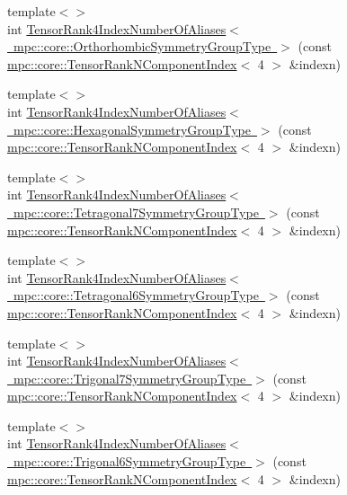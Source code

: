 \begin{DoxyCompactItemize}
\item 
{\footnotesize template$<$$>$ }\\int \mbox{\hyperlink{namespacempc_1_1core_a437f4bdfb137d17ac070b9ff54f889bf}{Tensor\+Rank4\+Index\+Number\+Of\+Aliases$<$ mpc\+::core\+::\+Orthorhombic\+Symmetry\+Group\+Type $>$}} (const \mbox{\hyperlink{classmpc_1_1core_1_1_tensor_rank_n_component_index}{mpc\+::core\+::\+Tensor\+Rank\+N\+Component\+Index}}$<$ 4 $>$ \&indexn)
\item 
{\footnotesize template$<$$>$ }\\int \mbox{\hyperlink{namespacempc_1_1core_acced519e371dd13b347144a098e4b34f}{Tensor\+Rank4\+Index\+Number\+Of\+Aliases$<$ mpc\+::core\+::\+Hexagonal\+Symmetry\+Group\+Type $>$}} (const \mbox{\hyperlink{classmpc_1_1core_1_1_tensor_rank_n_component_index}{mpc\+::core\+::\+Tensor\+Rank\+N\+Component\+Index}}$<$ 4 $>$ \&indexn)
\item 
{\footnotesize template$<$$>$ }\\int \mbox{\hyperlink{namespacempc_1_1core_afe7eb270332a274e4ee837d6d0f740bf}{Tensor\+Rank4\+Index\+Number\+Of\+Aliases$<$ mpc\+::core\+::\+Tetragonal7\+Symmetry\+Group\+Type $>$}} (const \mbox{\hyperlink{classmpc_1_1core_1_1_tensor_rank_n_component_index}{mpc\+::core\+::\+Tensor\+Rank\+N\+Component\+Index}}$<$ 4 $>$ \&indexn)
\item 
{\footnotesize template$<$$>$ }\\int \mbox{\hyperlink{namespacempc_1_1core_ac976c8820421fa076d712f77e36a871e}{Tensor\+Rank4\+Index\+Number\+Of\+Aliases$<$ mpc\+::core\+::\+Tetragonal6\+Symmetry\+Group\+Type $>$}} (const \mbox{\hyperlink{classmpc_1_1core_1_1_tensor_rank_n_component_index}{mpc\+::core\+::\+Tensor\+Rank\+N\+Component\+Index}}$<$ 4 $>$ \&indexn)
\item 
{\footnotesize template$<$$>$ }\\int \mbox{\hyperlink{namespacempc_1_1core_ab16fd1951e2b9044702fa7844807dd84}{Tensor\+Rank4\+Index\+Number\+Of\+Aliases$<$ mpc\+::core\+::\+Trigonal7\+Symmetry\+Group\+Type $>$}} (const \mbox{\hyperlink{classmpc_1_1core_1_1_tensor_rank_n_component_index}{mpc\+::core\+::\+Tensor\+Rank\+N\+Component\+Index}}$<$ 4 $>$ \&indexn)
\item 
{\footnotesize template$<$$>$ }\\int \mbox{\hyperlink{namespacempc_1_1core_a7063739f60a5e7fcb313c8e51d0966bd}{Tensor\+Rank4\+Index\+Number\+Of\+Aliases$<$ mpc\+::core\+::\+Trigonal6\+Symmetry\+Group\+Type $>$}} (const \mbox{\hyperlink{classmpc_1_1core_1_1_tensor_rank_n_component_index}{mpc\+::core\+::\+Tensor\+Rank\+N\+Component\+Index}}$<$ 4 $>$ \&indexn)

\end{DoxyCompactItemize}
